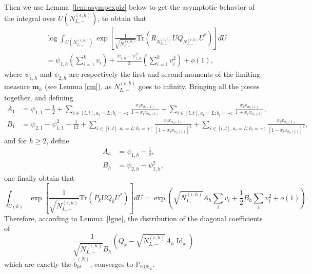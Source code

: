 \documentclass[11pt]{amsart}
\theoremstyle{plain}
\theoremstyle{definition}
\theoremstyle{remark}
\newcommand\PP{{\mathbb P}}
\newcommand\GUE{{\mathbb {GUE}}}
\newcommand\si{\sigma}
\numberwithin{equation}{section}
\numberwithin{theorem}{section}
\numberwithin{figure}{section}
\begin{document}
Then we use Lemma~\ref{lem:asympexpiz} below to get the asymptotic behavior of the
integral over $U(N_{L,-}^{(\epsilon,h)})$, to obtain that
\begin{align*}
 & \log\int_{U(N_{L,-}^{(\epsilon,h)})}\exp\left[\frac{1}{\sqrt{N_{L,-}^{(\epsilon,h)}}}\mathrm{Tr}\left(R_{N_{L,-}^{(\epsilon,h)}}UQ_{N_{L,-}^{(\epsilon,h)}}U^*\right)\right]dU\\
 &=\psi_{1,h}
  \left(\sum_{i=1}^k v_i\right)+\frac{\psi_{2,h}-\psi_{1,h}^2}{2}\left(\sum_{i=1}^k
  v_i^2\right)+o(1),
\end{align*}
where $\psi_{1,h}$ and $\psi_{2,h}$ are respectively the first and second moments of the
limiting measure $\mathbf{m}_{h}$ (see Lemma \ref{cm}), as $N_{L,-}^{(\epsilon,h)}$ goes to infinity.
Bringing all the pieces together, and defining
\begin{align}
  A_1 &= \psi_{1,1}-\frac{1}{2}+\sum_{i\in[l..t],a_i=L;b_i=+;}\frac{x_ix_{\si_0(1)}}{1-x_ix_{\si_0(1)}}+\sum_{i\in[l..t],a_i=L;b_i=+;}\frac{x_ix_{\si_0(1)}}{1+x_ix_{\si_0(1)}},\label{da1}
\\
    B_1 &= \psi_{2,1}-\psi_{1,1}^2-\frac{1}{12}+\sum_{i\in[l..t],a_i=L;b_i=+;}\frac{x_ix_{\si_0(1)}}{[1+x_ix_{\si_0(1)}]^2}+\sum_{i\in[l..t],a_i=L;b_i=+;}\frac{x_ix_{\si_0(1)}}{[1-x_ix_{\si_0(1)}]^2},\label{db1}
\end{align}
and for $h\geq 2$, define
\begin{align}
  A_h &= \psi_{1,h}-\frac{1}{2},\label{dah}
\\
    B_h &= \psi_{2,h}-\psi_{1,h}^2,\label{dbh}
\end{align}
one finally obtain that
\begin{equation*}
  \int_{U(k)}\exp\left[\frac{1}{\sqrt{N_{L,-}^{(\epsilon,h)}}}\mathrm{Tr}\left(P_k U Q_kU^*\right)\right]dU=
  \exp\left(\sqrt{N_{L,-}^{(\epsilon,h)}}A_h\sum_i v_i+
    \frac{1}{2}B_h \sum_i v_i^2+o(1)\right).  
\end{equation*}
Therefore, according to Lemma~\ref{lgue}, the distribution of the diagonal
coefficients  of
\begin{equation*}
\frac{1}{\sqrt{N_{L,-}^{(\epsilon,h)}}B_h}(Q_k-\sqrt{N_{L,-}^{(\epsilon,h)}} A_h \operatorname{Id}_k)
\end{equation*}
which are exactly the
$\tilde{b}_{kl}^{(N)}$, converges to $\PP_{\GUE_k}$.
\end{document}

